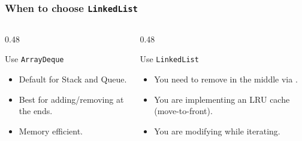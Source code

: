 \documentclass[aspectratio=169,10pt,compress]{beamer}
\begin{document}
\begin{frame}[t,fragile]\frametitle{When to choose \texttt{LinkedList}}
  \begin{columns}[T]
    \begin{column}{0.48\textwidth}
      \begin{block}{Use \texttt{ArrayDeque}}
        \small
        \begin{itemize}
          \item Default for Stack and Queue.
          \item Best for adding/removing at the ends.
          \item Memory efficient.
        \end{itemize}
      \end{block}
    \end{column}
    \begin{column}{0.48\textwidth}
      \begin{block}{Use \texttt{LinkedList}}
        \small
        \begin{itemize}
          \item You need to remove in the middle via .
          \item You are implementing an LRU cache (move-to-front).
          \item You are modifying while iterating.
        \end{itemize}
      \end{block}
    \end{column}
  \end{columns}
\end{frame}

\begin{frame}[t,fragile]
  \begin{center}\vspace{4cm}\end{center}
\end{frame}
\end{document}

